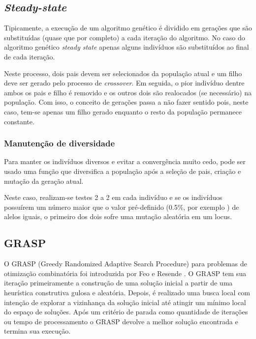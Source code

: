 \documentclass[12pt,a4paper]{article}
\begin{document}
    \subsection{\emph{Steady-state}}

        Tipicamente, a execução de um algoritmo genético é dividido em gerações que são substituídas (quase que por completo) a cada iteração do algoritmo. No caso do algoritmo genético
        \emph{steady state} apenas alguns indivíduos são substituídos ao final de cada iteração.

        Neste processo, dois pais devem ser selecionados da população atual e um filho deve ser gerado pelo processo de \emph{crossover}. Em seguida, o pior indivíduo dentre ambos os pais e filho é
        removido e os outros dois são realocados (se necessário) na população. Com isso, o conceito de gerações passa a não fazer sentido pois, neste caso, tem-se apenas um filho gerado enquanto o
        resto da população permanece constante.  

    \subsubsection{Manutenção de diversidade}

        Para manter os indivíduos diversos e evitar a convergência muito cedo, pode ser usado uma função que diversifica a população após a seleção de pais, criação e mutação da geração atual.

        Neste caso, realizam-se testes 2 a 2 em cada indivíduo e se os indivíduos possuírem um número maior que o valor pré-definido (0.5$\%$, por exemplo ) de alelos iguais, o primeiro dos
        dois sofre uma mutação aleatória em um locus.

\subsection{GRASP}
    O GRASP (Greedy Randomized Adaptive Search Procedure) para problemas de otimização combinatória foi introduzida por Feo e Resende \cite{feo1989probabilistic}. O GRASP tem sua iteração
    primeiramente a construção de uma solução inicial a partir de uma heurística construtiva gulosa e aleatória. Depois, é realizado uma busca local com intenção de explorar a vizinhança da
    solução inicial até atingir um mínimo local do espaço de soluções. Após um critério de parada como quantidade de iterações ou tempo de processamento o GRASP devolve a melhor solução
    encontrada e termina sua execução.
\end{document}
